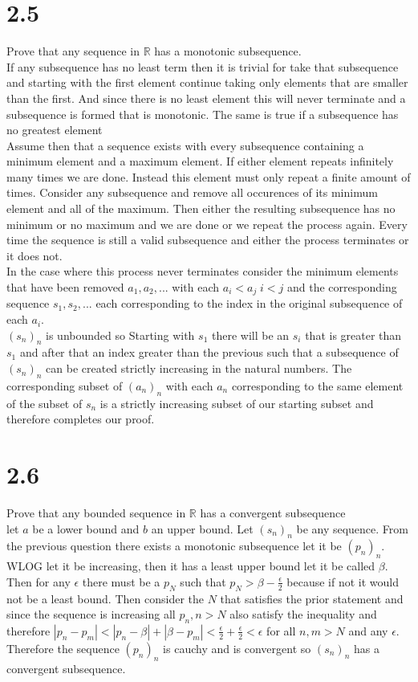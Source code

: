 \documentclass{article}
\begin{document}
    \section{2.5}
    Prove that any sequence in $ \mathbb{R} $ has a monotonic subsequence.
    \\
    If any subsequence has no least term then it is trivial for take that subsequence and starting with the first element continue taking only elements that are smaller than the first. And since there is no least element this will never
    terminate and a subsequence is formed that is monotonic. The same is true if a subsequence has no greatest element\\
    Assume then that a sequence exists with every subsequence containing a minimum element and a maximum element. If either element repeats infinitely many times we are done. Instead this element must only repeat a finite amount of times.
    Consider any subsequence and remove all occurences of its minimum element and all of the maximum. Then either the resulting subsequence has no minimum or no maximum and we are done or we repeat the process again. Every time the sequence is still
    a valid subsequence and either the process terminates or it does not.
    \\
    In the case where this process never terminates consider the minimum elements that have been removed $a_1,a_2,...$ with each $a_i < a_j \; i < j$ and the corresponding sequence $s_1,s_2,...$ each corresponding to the index in the original subsequence of each $a_i$.
    \\
    $(s_n)_n$ is unbounded so
    Starting with $s_1$ there will be an $s_i$ that is greater than $s_1$ and after that an index greater than the previous such that a subsequence of $(s_n)_n$ can be created strictly increasing in the natural numbers. The corresponding subset of $(a_n)_n$ with each $a_n$ corresponding to the same element of the subset of $s_n$ is a strictly
    increasing subset of our starting subset and therefore completes our proof.
    \section{2.6}
    Prove that any bounded sequence in  $ \mathbb{R} $ has a convergent subsequence\\
    let $a$ be a lower bound and $b$ an upper bound. Let $(s_n)_n$ be any sequence. From the previous question
    there exists a monotonic subsequence let it be $(p_n)_n$. WLOG let it be increasing, then it has a least upper bound let it be called $\beta $. Then for any $\epsilon $
    there must be a $p_N$ such that $p_N > \beta - \frac{\epsilon}{2} $ because if not it would not be a least bound. Then consider the $N$ that satisfies the prior statement and since the sequence
is increasing all $p_n, n > N$ also satisfy the inequality and therefore $|p_n-p_m| < |p_n - \beta | + |\beta - p_m| < \frac{\epsilon }{2} + \frac{\epsilon}{2}  < \epsilon $ for all $n,m > N$ and any $\epsilon $. Therefore the sequence $(p_n)_n$ is cauchy and is convergent so $(s_n)_n$ has a convergent subsequence.
\end{document}
